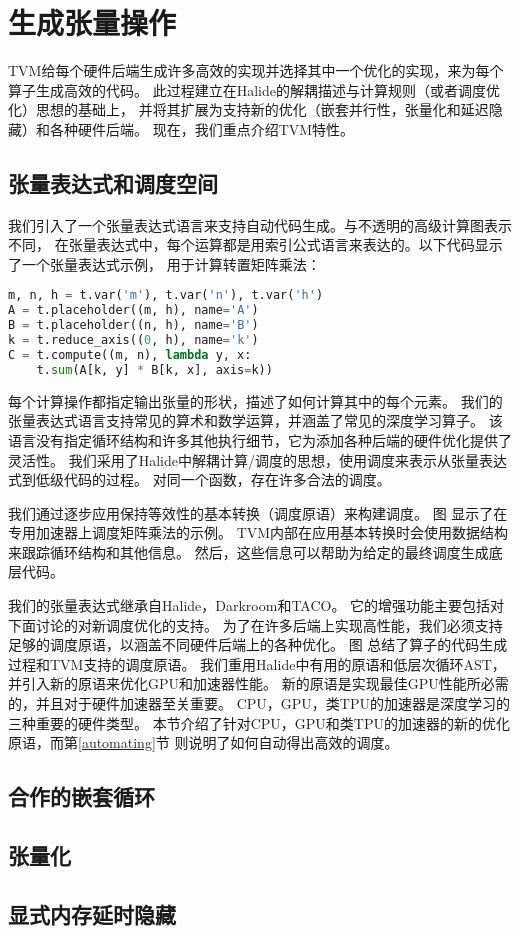 \section{生成张量操作}
TVM给每个硬件后端生成许多高效的实现并选择其中一个优化的实现，来为每个算子生成高效的代码。
此过程建立在Halide的解耦描述与计算规则（或者调度优化）思想的基础上，
并将其扩展为支持新的优化（嵌套并行性，张量化和延迟隐藏）和各种硬件后端。
现在，我们重点介绍TVM特性。

\subsection{张量表达式和调度空间}
我们引入了一个张量表达式语言来支持自动代码生成。与不透明的高级计算图表示不同，
在张量表达式中，每个运算都是用索引公式语言来表达的。以下代码显示了一个张量表达式示例，
用于计算转置矩阵乘法：

\begin{lstlisting}[language={Python}]
m, n, h = t.var('m'), t.var('n'), t.var('h')
A = t.placeholder((m, h), name='A')
B = t.placeholder((n, h), name='B')
k = t.reduce_axis((0, h), name='k')
C = t.compute((m, n), lambda y, x:
    t.sum(A[k, y] * B[k, x], axis=k)) 
\end{lstlisting}

每个计算操作都指定输出张量的形状，描述了如何计算其中的每个元素。
我们的张量表达式语言支持常见的算术和数学运算，并涵盖了常见的深度学习算子。
该语言没有指定循环结构和许多其他执行细节，它为添加各种后端的硬件优化提供了灵活性。
我们采用了Halide中解耦计算/调度的思想，使用调度来表示从张量表达式到低级代码的过程。
对同一个函数，存在许多合法的调度。

我们通过逐步应用保持等效性的基本转换（调度原语）来构建调度。
图 显示了在专用加速器上调度矩阵乘法的示例。
TVM内部在应用基本转换时会使用数据结构来跟踪循环结构和其他信息。
然后，这些信息可以帮助为给定的最终调度生成底层代码。

我们的张量表达式继承自Halide，Darkroom和TACO。
它的增强功能主要包括对下面讨论的对新调度优化的支持。
为了在许多后端上实现高性能，我们必须支持足够的调度原语，以涵盖不同硬件后端上的各种优化。
图 总结了算子的代码生成过程和TVM支持的调度原语。
我们重用Halide中有用的原语和低层次循环AST，并引入新的原语来优化GPU和加速器性能。
新的原语是实现最佳GPU性能所必需的，并且对于硬件加速器至关重要。
CPU，GPU，类TPU的加速器是深度学习的三种重要的硬件类型。
本节介绍了针对CPU，GPU和类TPU的加速器的新的优化原语，而第\ref{automating}节
则说明了如何自动得出高效的调度。

\subsection{合作的嵌套循环}

\subsection{张量化}

\subsection{显式内存延时隐藏}